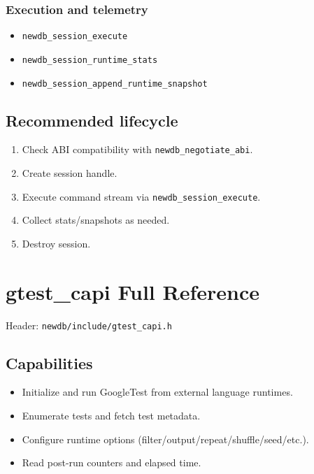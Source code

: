 \documentclass[11pt,a4paper]{article}
\begin{document}
\subsubsection*{Execution and telemetry}
\begin{itemize}
  \item \texttt{newdb\_session\_execute}
  \item \texttt{newdb\_session\_runtime\_stats}
  \item \texttt{newdb\_session\_append\_runtime\_snapshot}
\end{itemize}

\subsection{Recommended lifecycle}
\begin{enumerate}
  \item Check ABI compatibility with \texttt{newdb\_negotiate\_abi}.
  \item Create session handle.
  \item Execute command stream via \texttt{newdb\_session\_execute}.
  \item Collect stats/snapshots as needed.
  \item Destroy session.
\end{enumerate}

\section{gtest\_capi Full Reference}
Header: \texttt{newdb/include/gtest\_capi.h}

\subsection{Capabilities}
\begin{itemize}
  \item Initialize and run GoogleTest from external language runtimes.
  \item Enumerate tests and fetch test metadata.
  \item Configure runtime options (filter/output/repeat/shuffle/seed/etc.).
  \item Read post-run counters and elapsed time.
\end{itemize}
\end{document}
